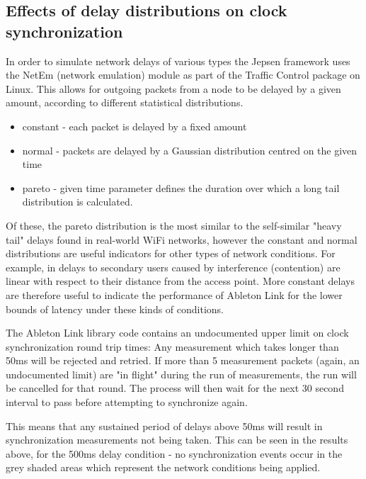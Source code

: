 \documentclass[11pt]{article} %
\theoremstyle{plain}
\theoremstyle{definition}
\begin{document}
\subsection{Effects of delay distributions on clock synchronization}

In order to simulate network delays of various types the Jepsen framework uses
the NetEm (network emulation) module as part of the Traffic Control package on
Linux\cite{hemminger2005network}. This allows for outgoing packets from a node
to be delayed by a given amount, according to different statistical
distributions.

\begin{itemize}
  \item constant - each packet is delayed by a fixed amount
  \item normal - packets are delayed by a Gaussian distribution centred on the given time
  \item pareto - given time parameter defines the duration over which a long tail distribution is calculated.
\end{itemize}

Of these, the pareto distribution is the most similar to the self-similar
"heavy tail" delays found in real-world WiFi
networks\cite{bletsas2005evaluation}\cite{zhang2008delay}, however the constant
and normal distributions are useful indicators for other types of network
conditions. For example, in \cite{wang2014improving} delays to secondary users
caused by interference (contention) are linear with respect to their distance
from the access point.  More constant delays are therefore useful to indicate
the performance of Ableton Link for the lower bounds of latency under these
kinds of conditions.

The Ableton Link library code contains an undocumented upper limit on clock
synchronization round trip times: Any measurement which takes longer than 50ms
will be rejected and retried. If more than 5 measurement packets (again, an
undocumented limit) are "in flight" during the run of measurements, the run
will be cancelled for that round. The process will then wait for the next 30
second interval to pass before attempting to synchronize again.

This means that any sustained period of delays above 50ms will result in
synchronization measurements not being taken. This can be seen in the results
above, for the 500ms delay condition - no synchronization events occur in the
grey shaded areas which represent the network conditions being applied.
\end{document}

